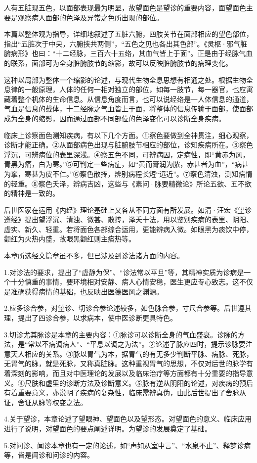 \documentclass[12pt]{ctexbook}
\begin{document}


人有五脏现五色，以面部表现最为明显，故望面色是望诊的重要内容，面望面色主要是观察病人面部的色泽及异常之色所出现的部位。

本篇以整体观为指导，详细地叙述了五脏六腑，四肢关节在面部相应的望色部位，指出“五脏次于中央，六腑挟共两侧”，“五色之见也各出其色部”。《灵枢·邪气脏腑病形》也曰：“十二经脉，三百六十五络，其血气皆上于面”。正是由于经脉气血的联系，面部可为全身脏腑肢节的缩影，故可以反映脏腑肢节的病理变化。

这种以局部为整体一个缩影的论述，与现代生物全息思想有相通之处。根据生物全息律的一般原理，人体的任何一相对独立的部位，如每一肢节，每一器官，也应寓藏着整个机体的生命信息。从信息角度而言，也可以说经络是一人体信息的通道，气血是信息的载体，十二经脉之气血皆上于面，将整体的信息传输于面部，使面部成为全身的缩影，因而通过面部不同部位的色泽变化可以诊断全身疾病。



临床上诊察面色测知疾病，有以下几个方面。①察色要做到全神贯注，细心观察，诊断才能正确。②从面部病色出现与脏腑肢节相应的部位，诊知疾病所在。③察色浮沉，可辨病位的表里深浅。④察五色不同，可辨病因，定病性，即“黄赤为风，青黑为痛，白为寒。”⑤可判定一些病症，如“黄而膏润为脓，赤甚者为血”，“病甚为挛，寒甚为皮不仁。”⑥察色散抟，辨别病程长短“远近”。⑦察色清浊，测知病情的轻重。⑧察色夭泽，辨病吉凶，这些与《素问·脉要精微论》所论五欲、五不欲的精神是一致的。

后世医家在运用《内经》理论基础上又各从不同方面有所发展。如清·汪宏《望诊遵经》提出望浮沉、清浊、微甚、散抟，泽夭十法，用以鉴别疾病的表里、阴阳、虚实、新久、轻重。若将面色各部综合运用，更能辨病入微。如眼黑为痰饮中停，颧红为火热内盛，故眼黑颧红则主痰热等。

\xiaojie

本章所选经文篇章虽不多，但已涉及到诊法诸方面的内容。

1.对诊法的要求，提出了“虚静为保”、“诊法常以平旦”等，其精神实质为诊病是一个十分慎重的事情，要环境相对安静、病人心情安稳，医生更应专心致志。这不仅是准确获得病情的基础，也反映出医德医风之渊源。

2.应多诊合参，对望诊、切诊合参论述较多，如色脉合参，寸尺合参等。后世遵其理，提出了四诊合参，以求病本，使中医诊断更具特色。

3.切诊尤其脉诊是本章的主要内容：①脉诊可以诊断全身的气血盛衰。诊脉的方法，是“常以不病调病人”、“平息以调之为法”。②论述了脉应四时，提示诊脉要注意天人相应的关系。③脉以胃气为本，据胃气的有无多少判断平脉、病脉、死脉，无胃气的脉，就是死脉，又称真脏脉。这种重视胃气的思想，不仅对后世的脉学有着深刻的影响，而且对中医理论的发展以及临床治疗等方面都有十分重要的指导意义。④尺肤和虚里的诊断方法及诊断意义。⑤脉有逆从阴阳的论述，对疾病的预后有着重要意义，亦说明了疾病的复杂性，临床需辨真伪，由此后世提出了舍脉从证，舍证从脉等权变之法。

4.关于望诊，本章论述了望眼神、望面色以及望形态。对望面色的意义、临床应用进行了说明，对望面色的要点阐述详明。为望诊的发展奠定了基础。

5.对问诊、闻诊本章也有一定的论述，如“声如从室中言”、“水泉不止”、释梦诊病等，皆是闻诊和问诊的内容。

\ifx \allfiles \undefined
\end{document}
